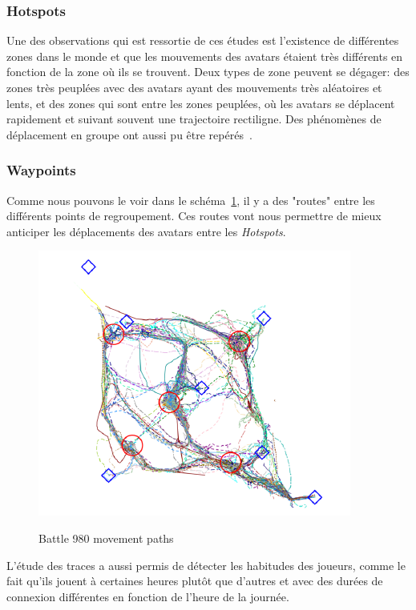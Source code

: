 		\subsubsection{Hotspots}
	Une des observations qui est ressortie de ces études est l'existence de différentes zones dans le monde et que les mouvements des avatars étaient très différents en fonction de la zone où ils se trouvent. Deux types de zone peuvent se dégager: des zones très peuplées avec des avatars ayant des mouvements très aléatoires et lents, et des zones qui sont entre les zones peuplées, où les avatars se déplacent rapidement et suivant souvent une trajectoire rectiligne. Des phénomènes de déplacement en groupe ont aussi pu être repérés~\cite{15141312}. \\
		\subsubsection{Waypoints}
	Comme nous pouvons le voir dans le schéma~\ref{sch_trace}, il y a des "routes" entre les différents points de regroupement. Ces routes vont nous permettre de mieux anticiper les déplacements des avatars entre les \textit{Hotspots}.
        \vspace{1mm}
        \begin{figure}[!h]
        \centering
        \includegraphics[scale=0.75]{../Images/trace.png}\\
        \caption{Battle 980 movement paths}
        \label{sch_trace}
        \end{figure}	
        \vspace{1mm}
\newline
	L'étude des traces a aussi permis de détecter les habitudes des joueurs, comme le fait qu'ils jouent à certaines heures plutôt que d'autres et avec des durées de connexion différentes en fonction de l'heure de la journée.
